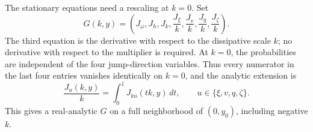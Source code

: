 \documentclass[11pt]{article}
\theoremstyle{definition}
\theoremstyle{remark}
\begin{document}
The stationary equations need a rescaling at \(k=0\). Set
\begin{equation}\label{eq:stationary-system}
 G(k,y)=\left(J_\omega,J_h,J_k,
 \frac{J_\xi}{k},\frac{J_v}{k},\frac{J_q}{k},\frac{J_\zeta}{k}\right).
\end{equation}
The third equation is the derivative with respect to the dissipative scale \(k\); no derivative with respect to the multiplier is required. At \(k=0\), the probabilities are independent of the four jump-direction variables. Thus every numerator in the last four entries vanishes identically on \(k=0\), and the analytic extension is
\begin{equation}\label{eq:analytic-division}
 \frac{J_u(k,y)}k=\int_0^1J_{ku}(tk,y)\,dt,
 \qquad u\in\{\xi,v,q,\zeta\}.
\end{equation}
This gives a real-analytic \(G\) on a full neighborhood of \((0,y_0)\), including negative \(k\).
\end{document}
